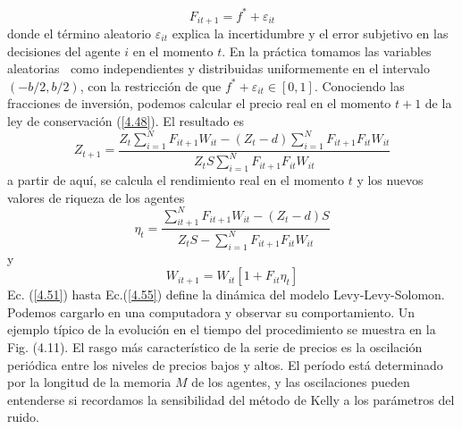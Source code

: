\documentclass[12pt,a4paper]{article}
\begin{document}
\begin{equation}
F_{it+1}=f^{*}+\varepsilon_{it}\label{4.52}
\end{equation}
donde el término aleatorio $ \varepsilon_{it} $ explica la incertidumbre y el error subjetivo en las decisiones del agente $ i $ en el momento $ t $. En la práctica tomamos las variables aleatorias $ \ $ como independientes y distribuidas uniformemente en el intervalo $ (-b/2,b/2) $, con la restricción de que $f^{*}+\varepsilon_{it}\in [0,1]$. Conociendo las fracciones de inversión, podemos calcular el precio real en el momento $ t + 1 $ de la ley de conservación (\ref{4.48}). El resultado es
\begin{equation}
Z_{t+1}=\frac{Z_t\sum^{N}_{i=1}F_{it+1}W_{it} -(Z_t-d)\sum^{N}_{i=1}F_{it+1}F_{it}W_{it} }{Z_t S\sum^{N}_{i=1}F_{it+1}F_{it}W_{it}}\label{4.53}
\end{equation}
a partir de aquí, se calcula el rendimiento real en el momento $ t $ y los nuevos valores de riqueza de los agentes
\begin{equation}
\eta_{t}=\frac{\sum^{N}_{it+1}F_{it+1}W_{it}-(Z_t-d)S}{Z_tS-\sum^{N}_{i=1}F_{it+1}F_{it}W_{it}}\label{4.54}
\end{equation}
y 
\begin{equation}
W_{it+1}=W_{it}[1+F_{it}\eta_t]\label{4.55}
\end{equation}
\quad Ec. (\ref{4.51}) hasta Ec.(\ref{4.55}) define la dinámica del modelo Levy-Levy-Solomon. Podemos cargarlo en una computadora y observar su comportamiento. Un ejemplo típico de la evolución en el tiempo del procedimiento se muestra en la Fig. (4.11). El rasgo más característico de la serie de precios es la oscilación periódica entre los niveles de precios bajos y altos. El período está determinado por la longitud de la memoria $M$ de los agentes, y las oscilaciones pueden entenderse si recordamos la sensibilidad del método de Kelly a los parámetros del ruido.\\
\end{document}
